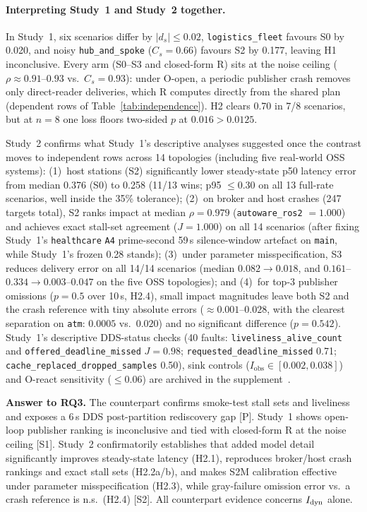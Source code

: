 \paragraph{Interpreting Study~1 and Study~2 together.} In Study~1, six scenarios differ by $|d_s| \le 0.02$, \texttt{logistics\_\allowbreak fleet} favours S0 by 0.020, and noisy \texttt{hub\_\allowbreak and\_\allowbreak spoke} ($C_s = 0.66$) favours S2 by 0.177, leaving H1 inconclusive. Every arm (S0--S3 and closed-form R) sits at the noise ceiling ($\rho \approx 0.91$--$0.93$ vs.\ $C_s = 0.93$): under O-open, a periodic publisher crash removes only direct-reader deliveries, which R computes directly from the shared plan (dependent rows of Table~\ref{tab:independence}). H2 clears 0.70 in 7/8 scenarios, but at $n = 8$ one loss floors two-sided $p$ at $0.016 > 0.0125$.

Study~2 confirms what Study~1's descriptive analyses suggested once the contrast moves to independent rows across 14 topologies (including five real-world OSS systems): (1)~host stations (S2) significantly lower steady-state p50 latency error from median 0.376 (S0) to 0.258 (11/13 wins; p95 $\le 0.30$ on all 13 full-rate scenarios, well inside the 35\% tolerance); (2)~on broker and host crashes (247 targets total), S2 ranks impact at median $\rho = 0.979$ (\texttt{autoware\_ros2} $= 1.000$) and achieves exact stall-set agreement ($J = 1.000$) on all 14 scenarios (after fixing Study~1's \texttt{healthcare} \texttt{A4} prime-second 59\,s silence-window artefact on \texttt{main}, while Study~1's frozen 0.28 stands); (3)~under parameter misspecification, S3 reduces delivery error on all 14/14 scenarios (median $0.082 \to 0.018$, and $0.161$--$0.334 \to 0.003$--$0.047$ on the five OSS topologies); and (4)~for top-3 publisher omissions ($p = 0.5$ over 10\,s, H2.4), small impact magnitudes leave both S2 and the crash reference with tiny absolute errors ($\approx 0.001$--$0.028$, with the clearest separation on \texttt{atm}: $0.0005$ vs.\ $0.020$) and no significant difference ($p = 0.542$). Study~1's descriptive DDS-status checks (40 faults: \texttt{liveliness\_alive\_count} and \texttt{offered\_deadline\_missed} $J = 0.98$; \texttt{requested\_deadline\_missed} 0.71; \texttt{cache\_\allowbreak replaced\_\allowbreak dropped\_\allowbreak samples} 0.50), sink controls ($I_{\mathrm{obs}} \in [0.002, 0.038]$) and O-react sensitivity ($\le 0.06$) are archived in the supplement~\citep{sag-software}.

\textbf{Answer to RQ3.} The counterpart confirms smoke-test stall sets and liveliness and exposes a 6\,s DDS post-partition rediscovery gap [P]. Study~1 shows open-loop publisher ranking is inconclusive and tied with closed-form R at the noise ceiling [S1]. Study~2 confirmatorily establishes that added model detail significantly improves steady-state latency (H2.1), reproduces broker/host crash rankings and exact stall sets (H2.2a/b), and makes S2M calibration effective under parameter misspecification (H2.3), while gray-failure omission error vs.\ a crash reference is n.s.\ (H2.4) [S2]. All counterpart evidence concerns $I_{\mathrm{dyn}}$ alone.

